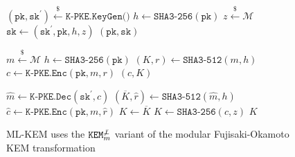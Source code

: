 \documentclass[letterpaper,12pt,titlepage,oneside,final]{book}
\newcommand{\kem}{\texttt{KEM}}
\newcommand{\pk}{\texttt{pk}}
\newcommand{\sk}{\texttt{sk}}
\newcommand{\leftsample}{\stackrel{\$}{\leftarrow}}
\begin{document}
\begin{figure}[htbp]
    \centering
    
    \begin{minipage}[t]{0.4\textwidth}
        \begin{algorithm}[H]
            \caption*{$\texttt{ML-KEM.KeyGen()}$}
            \begin{algorithmic}[1]
                \State $(\pk, \sk^\prime) \leftsample \texttt{K-PKE.KeyGen()}$
                \State $h \leftarrow \texttt{SHA3-256}(\pk)$
                \State $z \leftsample \mathcal{M}$
                \State $\sk \leftarrow (\sk^\prime, \pk, h, z)$
                \State \Return $(\pk, \sk)$
            \end{algorithmic}
        \end{algorithm} \vspace{-0.5cm}
        \begin{algorithm}[H]
            \caption*{$\texttt{ML-KEM.Encap}(\pk)$}
            \begin{algorithmic}[1]
                \State $m \leftsample \mathcal{M}$
                \State $h \leftarrow \texttt{SHA3-256}(\pk)$
                \State $(K, r) \leftarrow \texttt{SHA3-512}(m, h)$
                \State $c \leftarrow \texttt{K-PKE.Enc}(\pk, m ,r)$
                \State \Return $(c, K)$
            \end{algorithmic}
        \end{algorithm}
    \end{minipage}
    \begin{minipage}[t]{0.4\textwidth}
        \begin{algorithm}[H]
            \caption*{$\texttt{ML-KEM.Decap}(\sk, c)$}
            \begin{algorithmic}[1]
                \State $\hat{m} \leftarrow \texttt{K-PKE.Dec}(\sk^\prime, c)$
                \State $(\overline{K}, \hat{r}) \leftarrow \texttt{SHA3-512}(\hat{m}, h)$
                \State $\hat{c} \leftarrow \texttt{K-PKE.Enc}(\pk, m, \hat{r})$
                    \State $K \leftarrow \overline{K}$
                \Else 
                    \State $K \leftarrow \texttt{SHA3-256}(c, z)$
                \EndIf
                \State \Return $K$
            \end{algorithmic}
        \end{algorithm}
    \end{minipage}

    \caption{ML-KEM uses the $\kem^{\not\bot}_m$ variant of the modular Fujisaki-Okamoto KEM transformation}\label{fig:ml-kem-routines}
\end{figure}
\end{document}
